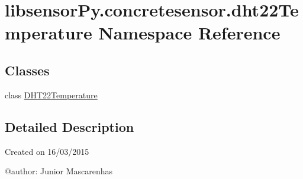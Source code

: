 \hypertarget{namespacelibsensorPy_1_1concretesensor_1_1dht22Temperature}{}\section{libsensor\+Py.\+concretesensor.\+dht22\+Temperature Namespace Reference}
\label{namespacelibsensorPy_1_1concretesensor_1_1dht22Temperature}
\subsection*{Classes}
\begin{DoxyCompactItemize}
\item 
class \hyperlink{classlibsensorPy_1_1concretesensor_1_1dht22Temperature_1_1DHT22Temperature}{D\+H\+T22\+Temperature}
\end{DoxyCompactItemize}


\subsection{Detailed Description}
\begin{DoxyVerb}Created on 16/03/2015

@author: Junior Mascarenhas
\end{DoxyVerb}
 